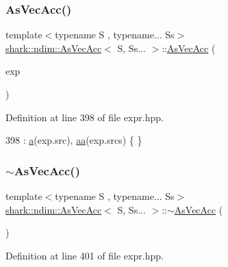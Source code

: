 \subsubsection{\texorpdfstring{As\+Vec\+Acc()}{AsVecAcc()}}
{\footnotesize\ttfamily template$<$typename S , typename... Ss$>$ \\
\hyperlink{classshark_1_1ndim_1_1_as_vec_acc}{shark\+::ndim\+::\+As\+Vec\+Acc}$<$ S, Ss... $>$\+::\hyperlink{classshark_1_1ndim_1_1_as_vec_acc}{As\+Vec\+Acc} (\begin{DoxyParamCaption}\item[{const \hyperlink{classshark_1_1ndim_1_1_as_vec_exp}{As\+Vec\+Exp}$<$ S, Ss... $>$ \&}]{exp }\end{DoxyParamCaption})}



Definition at line 398 of file expr.\+hpp.


\begin{DoxyCode}
398 : \hyperlink{classshark_1_1ndim_1_1_as_vec_acc_3_01_s_00_01_ss_8_8_8_01_4_aa23d501c29acbde8ff8d9e2c72bb4756}{a}(exp.src), \hyperlink{classshark_1_1ndim_1_1_as_vec_acc_3_01_s_00_01_ss_8_8_8_01_4_ab43adccf8b6c612647ae7a9986dad9e2}{aa}(exp.srcs) \{ \}
\end{DoxyCode}
\hypertarget{classshark_1_1ndim_1_1_as_vec_acc_3_01_s_00_01_ss_8_8_8_01_4_ad56112a1ff4e5f4bfa1808fdb6e34e43}{}\label{classshark_1_1ndim_1_1_as_vec_acc_3_01_s_00_01_ss_8_8_8_01_4_ad56112a1ff4e5f4bfa1808fdb6e34e43} 
\subsubsection{\texorpdfstring{$\sim$\+As\+Vec\+Acc()}{~AsVecAcc()}}
{\footnotesize\ttfamily template$<$typename S , typename... Ss$>$ \\
\hyperlink{classshark_1_1ndim_1_1_as_vec_acc}{shark\+::ndim\+::\+As\+Vec\+Acc}$<$ S, Ss... $>$\+::$\sim$\hyperlink{classshark_1_1ndim_1_1_as_vec_acc}{As\+Vec\+Acc} (\begin{DoxyParamCaption}{ }\end{DoxyParamCaption})}



Definition at line 401 of file expr.\+hpp.


